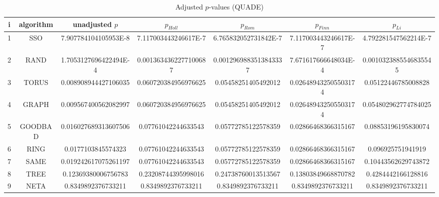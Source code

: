 \documentclass[a4paper,10pt]{article}
\begin{document}
\begin{landscape}
\begin{table}[!htp]
\centering\scriptsize
\caption{Adjusted $p$-values (QUADE)}
\begin{tabular}{ccccccc}
i&algorithm&unadjusted $p$&$p_{Holl}$&$p_{Rom}$&$p_{Finn}$&$p_{Li}$\\
\hline
1& SSO&7.907784104105953E-8&7.117003443246617E-7&6.765832052731842E-7&7.117003443246617E-7&4.792281547562214E-7\\
2& RAND&1.7053127696422494E-4&0.0013634362277100687&0.0012969883513843337&7.671617666648034E-4&0.0010323885546835545\\
3& TORUS&0.008908944427106035&0.060720384956976625&0.05458251405492012&0.026489432505503174&0.05122446785008828\\
4& GRAPH&0.009567400562082997&0.060720384956976625&0.05458251405492012&0.026489432505503174&0.054802962774784025\\
5& GOODBAD&0.016027689313607506&0.07761042244633543&0.05772785122578359&0.02866468366315167&0.08853196195830074\\
6& RING&0.0177103845574323&0.07761042244633543&0.05772785122578359&0.02866468366315167&0.096925751941919\\
7& SAME&0.019242617075261197&0.07761042244633543&0.05772785122578359&0.02866468366315167&0.10443562629743872\\
8& TREE&0.12369380006756783&0.23208744395998016&0.24738760013513567&0.13803849668870782&0.4284442166128816\\
9& NETA&0.8349892376733211&0.8349892376733211&0.8349892376733211&0.8349892376733211&0.8349892376733211\\
\hline
\end{tabular}
\end{table}

\end{landscape}
\end{document}
